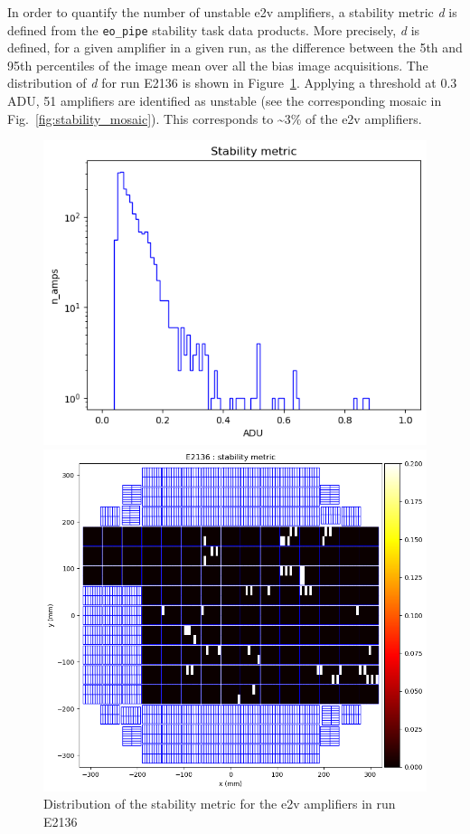 In order to quantify the number of unstable e2v amplifiers, a stability
metric \emph{d} is defined from the {\tt eo\_pipe}
stability task data products. More precisely, \emph{d} is defined, for a
given amplifier in a given run, as the difference between the 5th and
95th percentiles of the image mean over all the bias image acquisitions. The
distribution of \emph{d} for run E2136 is shown in Figure~\ref{fig:stability_dist}. Applying a
threshold at 0.3\,ADU, 51 amplifiers are identified as unstable (see the
corresponding mosaic in Fig.~\ref{fig:stability_mosaic}). This corresponds to \textasciitilde3\% of the e2v
amplifiers.

\begin{figure}[htbp]
\centering
\begin{minipage}{0.45\textwidth}
    \centering
    \includegraphics[width=\textwidth]{figures/E2136_distribution_d.png}
    \caption{Distribution of the stability metric for the e2v amplifiers in run E2136}
    \label{fig:stability_dist}
\end{minipage}
\hfill
\begin{minipage}{0.45\textwidth}
    \centering
    \includegraphics[width=\textwidth]{figures/E2136_mosaic_d.png}

\end{minipage}
\end{figure}
